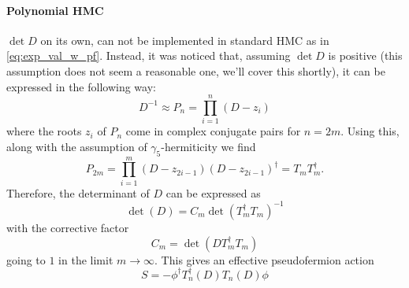 \documentclass[a4paper,10pt]{article}
\begin{document}
\paragraph{Polynomial HMC}
$\operatorname{det} D$ on its own, can not be implemented in standard HMC as in \eqref{eq:exp_val_w_pf}. Instead, it was noticed that, assuming $\operatorname{det} D$ is positive (this assumption does not seem a reasonable one, we'll cover this shortly), it can be expressed in the following way:
\begin{equation}
D^{-1} \approx P_{n} = \prod_{i=1}^{n}\left(D-z_{i}\right)
\end{equation}
where the roots $z_i$ of $P_{n}$ come in complex conjugate pairs for $n=2m$. Using this, along with the assumption of $\gamma_5$-hermiticity we find
\begin{equation}
P_{2 m}=\prod_{i=1}^{m}\left(D-z_{2 i-1}\right)\left(D-z_{2 i-1}\right)^\dagger = T_mT_m^\dagger.
\end{equation}
Therefore, the determinant of $D$ can be expressed as
\begin{equation}
\operatorname{det}(D)=C_{m} \operatorname{det}\left(T_{m}^{\dagger} T_{m}\right)^{-1}
\end{equation}
with the corrective factor 
\begin{equation}
C_{m}= \operatorname{det}\left(DT_{m}^{\dagger} T_{m}\right)
\end{equation}
going to $1$ in the limit $m\rightarrow \infty$. This gives an effective pseudofermion action
\begin{equation}
S=-\phi^{\dagger} T_{n}^{\dagger}(D) T_{n}(D) \phi
\end{equation}
\end{document}
